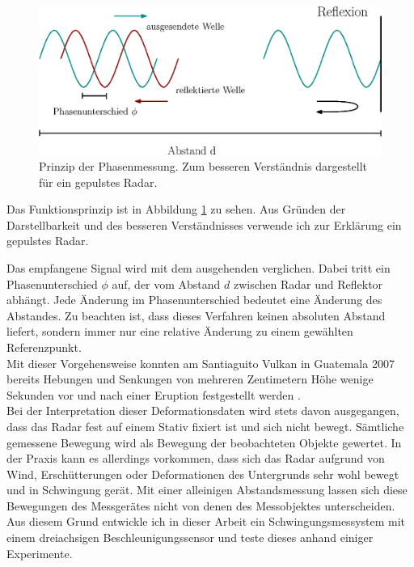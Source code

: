 \documentclass[12pt,a4paper,twoside,BCOR=12.5mm]{scrartcl}
\begin{document}
\begin{figure}[htb]
\centering
\includegraphics[scale=.8]{phasenmessung.eps}
\caption{Prinzip der Phasenmessung. Zum besseren Verständnis dargestellt für ein gepulstes Radar.}
\label{phasenmessung}
\end{figure}

Das Funktionsprinzip ist in Abbildung \ref{phasenmessung} zu sehen. Aus Gründen der Darstellbarkeit und des besseren Verständnisses verwende ich zur Erklärung ein gepulstes Radar.

Das empfangene Signal wird mit dem ausgehenden verglichen. Dabei tritt ein Phasenunterschied $\phi$ auf, der vom Abstand $d$ zwischen Radar und Reflektor abhängt. Jede Änderung im Phasenunterschied bedeutet eine Änderung des Abstandes. Zu beachten ist, dass dieses Verfahren keinen absoluten Abstand liefert, sondern immer nur eine relative Änderung zu einem gewählten Referenzpunkt.\\

Mit dieser Vorgehensweise konnten am Santiaguito Vulkan in Guatemala 2007 bereits Hebungen und Senkungen von mehreren Zentimetern Höhe wenige Sekunden vor und nach einer Eruption festgestellt werden \citep{Scharff:2007uq}. \\

Bei der Interpretation dieser Deformationsdaten wird stets davon ausgegangen, dass das Radar fest auf einem Stativ fixiert ist und sich nicht bewegt. Sämtliche gemessene Bewegung wird als Bewegung der beobachteten Objekte gewertet. 
In der Praxis kann es allerdings vorkommen, dass sich das Radar aufgrund von Wind, Erschütterungen oder Deformationen des Untergrunds sehr wohl bewegt und in Schwingung gerät. Mit einer alleinigen Abstandsmessung lassen sich diese Bewegungen des Messgerätes nicht von denen des Messobjektes unterscheiden.\\

Aus diesem Grund entwickle ich in dieser Arbeit ein Schwingungsmessystem mit einem dreiachsigen Beschleunigungssensor und teste dieses anhand einiger Experimente.
\end{document}

